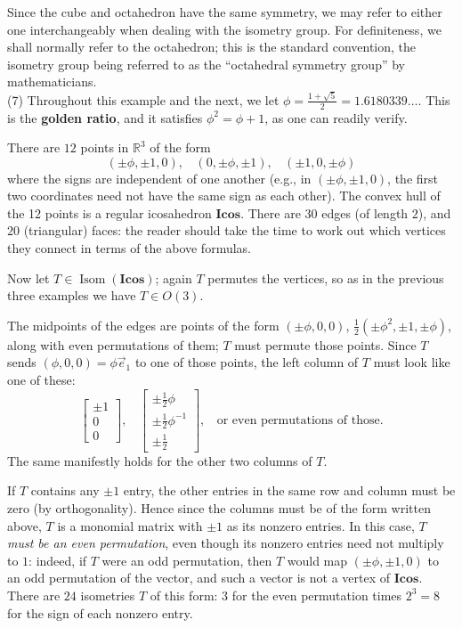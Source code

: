 \documentclass[leqno]{book}
\begin{document}
Since the cube and octahedron have the same symmetry, we may refer to either one interchangeably when dealing with the isometry group.  For definiteness, we shall normally refer to the octahedron; this is the standard convention, the isometry group being referred to as the ``octahedral symmetry group'' by mathematicians.\\

(7) Throughout this example and the next, we let $\phi=\frac{1+\sqrt 5}2=1.6180339\dots$.  This is the \textbf{golden ratio}, and it satisfies $\phi^2=\phi+1$, as one can readily verify.

There are $12$ points in $\mathbb R^3$ of the form
$$(\pm\phi,\pm 1,0),~~~~(0,\pm\phi,\pm 1),~~~~(\pm 1,0,\pm\phi)$$
where the signs are independent of one another (e.g., in $(\pm\phi,\pm 1,0)$, the first two coordinates need not have the same sign as each other).  The convex hull of the 12 points is a regular icosahedron $\mathbf{Icos}$.  There are $30$ edges (of length $2$), and $20$ (triangular) faces: the reader should take the time to work out which vertices they connect in terms of the above formulas.

Now let $T\in\operatorname{Isom}(\mathbf{Icos})$; again $T$ permutes the vertices, so as in the previous three examples we have $T\in O(3)$.

The midpoints of the edges are points of the form $(\pm\phi,0,0)$, $\frac 12(\pm\phi^2,\pm 1,\pm\phi)$, along with even permutations of them; $T$ must permute those points.  Since $T$ sends $(\phi,0,0)=\phi\vec e_1$ to one of those points, the left column of $T$ must look like one of these:
$$\begin{bmatrix}\pm 1\\0\\0\end{bmatrix},~~~~\begin{bmatrix}\pm\frac 12\phi\\\pm\frac 12\phi^{-1}\\\pm\frac 12\end{bmatrix},~~~~\text{or even permutations of those.}$$ %
The same manifestly holds for the other two columns of $T$.

If $T$ contains any $\pm 1$ entry, the other entries in the same row and column must be zero (by orthogonality).  Hence since the columns must be of the form written above, $T$ is a monomial matrix with $\pm 1$ as its nonzero entries.  In this case, \emph{$T$ must be an even permutation}, even though its nonzero entries need not multiply to $1$: indeed, if $T$ were an odd permutation, then $T$ would map $(\pm\phi,\pm 1,0)$ to an odd permutation of the vector, and such a vector is not a vertex of $\mathbf{Icos}$.  There are $24$ isometries $T$ of this form: $3$ for the even permutation times $2^3=8$ for the sign of each nonzero entry. %
\end{document}
